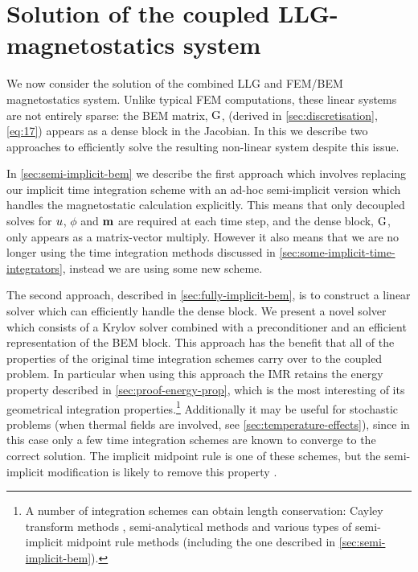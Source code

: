 
\section{Solution of the coupled LLG-magnetostatics system}
\label{sec:solut-coupl-syst}

We now consider the solution of the combined LLG and FEM/BEM magnetostatics system.
Unlike typical FEM computations, these linear systems are not entirely sparse: the BEM matrix, ${\mathbf{\mathrm{G}}}$, (derived in \cref{sec:discretisation}, \cref{eq:17}) appears as a dense block in the Jacobian.
In this  we describe two approaches to efficiently solve the resulting non-linear system despite this issue.

In \cref{sec:semi-implicit-bem} we describe the first approach which involves replacing our implicit time integration scheme with an ad-hoc semi-implicit version which handles the magnetostatic calculation explicitly.
This means that only decoupled solves for $u$, $\phi$ and $\boldsymbol{\mathrm{m}}$ are required at each time step, and the dense block, ${\mathbf{\mathrm{G}}}$, only appears as a matrix-vector multiply.
However it also means that we are no longer using the time integration methods discussed in \cref{sec:some-implicit-time-integrators}, instead we are using some new scheme.

The second approach, described in \cref{sec:fully-implicit-bem}, is to construct a linear solver which can efficiently handle the dense block.
We present a novel solver which consists of a Krylov solver combined with a preconditioner and an efficient representation of the BEM block.
This approach has the benefit that all of the properties of the original time integration schemes carry over to the coupled problem.
In particular when using this approach the IMR retains the energy property described in \cref{sec:proof-energy-prop}, which is the most interesting of its geometrical integration properties.\footnote{A number of integration schemes can obtain length conservation: Cayley transform methods \cite{Lewis2003}, semi-analytical methods \cite{Wiele2010} and various types of semi-implicit midpoint rule methods \cite{Spargo2003} \cite{Mentink2010} (including the one described in \cref{sec:semi-implicit-bem}).}
Additionally it may be useful for stochastic problems (\ie when thermal fields are involved, see \cref{sec:temperature-effects}), since in this case only a few time integration schemes are known to converge to the correct solution.
The implicit midpoint rule is one of these schemes, but the semi-implicit modification is likely to remove this property \cite{DAquino2006}.

